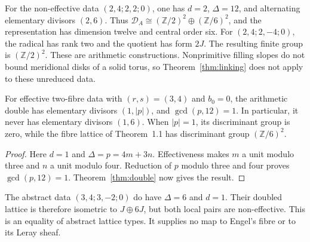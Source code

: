 For the non-effective data $(2,4;2,2;0)$, one has
$d=2$, $\Delta=12$, and alternating elementary divisors $(2,6)$.
Thus $\mathcal D_A\cong(\mathbb Z/2)^2\oplus(\mathbb Z/6)^2$,
and the representation has dimension twelve and central order six.
For $(2,4;2,-4;0)$, the radical has rank two and the quotient has
form $2J$.  The resulting finite group is $(\mathbb Z/2)^2$.
These are arithmetic constructions.  Nonprimitive filling slopes do
not bound meridional disks of a solid torus, so Theorem~\ref{thm:linking}
does not apply to these unreduced data.

\begin{proposition}\label{prop:separation}
For effective two-fibre data with $(r,s)=(3,4)$ and $b_0=0$, the
arithmetic double has elementary divisors $(1,|p|)$, and
$\gcd(p,12)=1$.  In particular, it never has elementary divisors
$(1,6)$.  When $|p|=1$, its discriminant group is zero, while the
fibre lattice of Theorem~1.1 has discriminant group $(\mathbb Z/6)^2$.
\end{proposition}

\begin{proof}
Here $d=1$ and $\Delta=p=4m+3n$.
Effectiveness makes $m$ a unit modulo three and $n$ a unit modulo four.
Reduction of $p$ modulo three and four proves $\gcd(p,12)=1$.
Theorem~\ref{thm:double} now gives the result.
\end{proof}

The abstract data $(3,4;3,-2;0)$ do have $\Delta=6$ and $d=1$.
Their doubled lattice is therefore isometric to $J\oplus6J$, but
both local pairs are non-effective.  This is an equality of abstract
lattice types.  It supplies no map to Engel's fibre or to its Leray sheaf.
